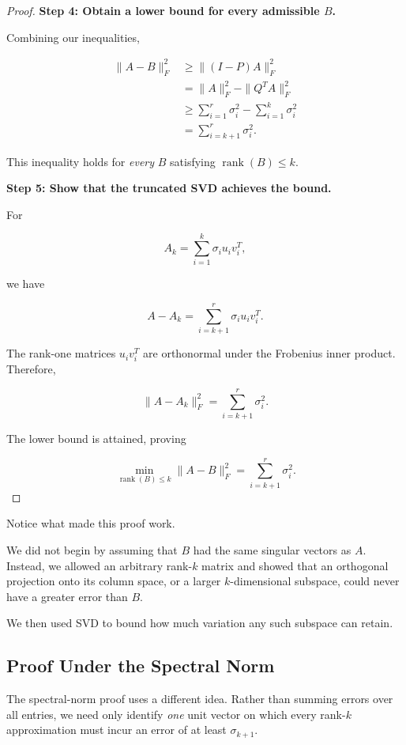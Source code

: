 \documentclass[11pt]{article}
\begin{document}
\begin{proof}
\textbf{Step 4: Obtain a lower bound
for every admissible $B$.}

Combining our inequalities,

\[
\begin{aligned}
\|A-B\|_F^2
&\geq \|(I-P)A\|_F^2\\
&=\|A\|_F^2-\|Q^TA\|_F^2\\
&\geq\sum_{i=1}^{r}\sigma_i^2
-\sum_{i=1}^{k}\sigma_i^2\\
&=\sum_{i=k+1}^{r}\sigma_i^2.
\end{aligned}
\]

This inequality holds for \emph{every}
$B$ satisfying $\operatorname{rank}(B)\leq k$.

\textbf{Step 5: Show that the truncated
SVD achieves the bound.}

For

\[
A_k=\sum_{i=1}^{k}\sigma_i u_i v_i^T,
\]

we have

\[
A-A_k=\sum_{i=k+1}^{r}\sigma_i u_i v_i^T.
\]

The rank-one matrices $u_i v_i^T$
are orthonormal under the Frobenius
inner product. Therefore,

\[
\boxed{
\|A-A_k\|_F^2
=\sum_{i=k+1}^{r}\sigma_i^2.
}
\]

The lower bound is attained, proving

\[
\boxed{
\min_{\operatorname{rank}(B)\leq k}
\|A-B\|_F^2
=\sum_{i=k+1}^{r}\sigma_i^2.
}
\]

\end{proof}

Notice what made this proof work.

We did not begin by assuming that
$B$ had the same singular vectors
as $A$. Instead, we allowed an
arbitrary rank-$k$ matrix and showed
that an orthogonal projection onto
its column space, or a larger
$k$-dimensional subspace, could
never have a greater error than $B$.

We then used SVD to bound how much
variation any such subspace can retain.

\subsection{Proof Under the Spectral Norm}

The spectral-norm proof uses a different
idea. Rather than summing errors over
all entries, we need only identify
\emph{one} unit vector on which every
rank-$k$ approximation must incur an
error of at least $\sigma_{k+1}$.
\end{document}
